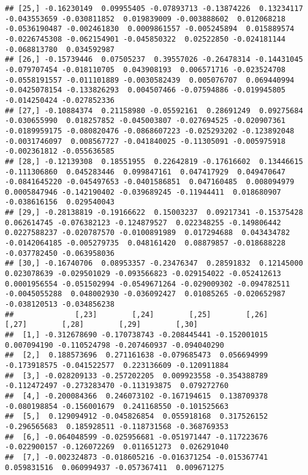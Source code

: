 \documentclass[
]{book}
\begin{document}
\begin{verbatim}
## [25,] -0.16230149  0.09955405 -0.07893713 -0.13874226  0.13234117 -0.043553659 -0.030811852  0.019839009 -0.003888602  0.012068218 -0.0536190487 -0.002461830  0.0009861557 -0.005245894  0.015889574 -0.0226745308 -0.062154901 -0.045850322  0.02522850 -0.024181144 -0.068813780  0.034592987
## [26,] -0.15739446  0.07505237  0.39557026 -0.26478314 -0.14431045 -0.079707454 -0.018110705  0.043908193  0.006571716 -0.023524708 -0.0558191557 -0.011101889 -0.0030582439  0.005076707  0.069440994 -0.0425078154 -0.133826293  0.004507466 -0.07594886 -0.019945805 -0.014250424 -0.027852336
## [27,] -0.10884374  0.21158980 -0.05592161  0.28691249  0.09275684 -0.030655990  0.018257852 -0.045003807 -0.027694525 -0.020907361 -0.0189959175 -0.080820476 -0.0868607223 -0.025293202 -0.123892048 -0.0031746097  0.008567727 -0.041840025 -0.11305091 -0.005975918 -0.002361812 -0.055636585
## [28,] -0.12139308  0.18551955  0.22642819 -0.17616602  0.13446615 -0.111306860  0.045283446  0.099847161  0.047417929  0.049470647 -0.0841645220 -0.045497653 -0.0401586851  0.047160485  0.008094979  0.0005847946 -0.142190402 -0.039689245 -0.11944411  0.018680907 -0.038616156  0.029540043
## [29,] -0.28138819 -0.19166622  0.15003237  0.09217341 -0.15375428  0.062614745 -0.076382123 -0.124879527  0.022348255 -0.149806442  0.0227588237 -0.020787570 -0.0100891989  0.017294688  0.043434782 -0.0142064185 -0.005279735  0.048161420  0.08879857 -0.018688228 -0.037782450 -0.063958036
## [30,] -0.16740706  0.08953357 -0.23476347  0.28591832  0.12145000  0.023078639 -0.029501029 -0.093566823 -0.029154022 -0.052412613  0.0001956554 -0.051502994 -0.0549671264 -0.029009302 -0.094782511 -0.0045055288  0.048002930 -0.036092427  0.01085265 -0.020652987 -0.038120513 -0.034856238
##              [,23]        [,24]        [,25]        [,26]        [,27]        [,28]        [,29]        [,30]
##  [1,] -0.312678690 -0.170738743 -0.208445441 -0.152001015  0.007094190 -0.110524798 -0.207460937 -0.094040290
##  [2,]  0.188573696  0.271161638 -0.079685473  0.056694999 -0.173918575 -0.041522577  0.223136609 -0.120911884
##  [3,] -0.028209133 -0.257202205  0.009923558 -0.354388789 -0.112472497 -0.273283470 -0.113193875  0.079272760
##  [4,] -0.200084366  0.246073102 -0.167194615  0.138709378 -0.080198854 -0.156001679  0.241168550 -0.101525663
##  [5,]  0.129094912 -0.045826854  0.055918168  0.317526152 -0.296565683  0.185928511 -0.118731568 -0.368769353
##  [6,] -0.064048599 -0.025956681 -0.051971447 -0.117223676 -0.022900157 -0.126072269  0.011651273  0.026291040
##  [7,] -0.002324873 -0.018605216 -0.016371254 -0.015367741  0.059831516  0.060994937 -0.057367411  0.009671275

\end{verbatim}
\end{document}

